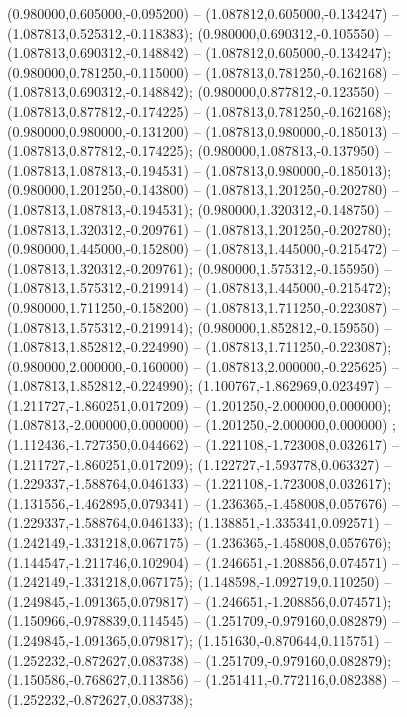  (0.980000,0.605000,-0.095200) -- (1.087812,0.605000,-0.134247) -- (1.087813,0.525312,-0.118383);
 (0.980000,0.690312,-0.105550) -- (1.087813,0.690312,-0.148842) -- (1.087812,0.605000,-0.134247);
 (0.980000,0.781250,-0.115000) -- (1.087813,0.781250,-0.162168) -- (1.087813,0.690312,-0.148842);
 (0.980000,0.877812,-0.123550) -- (1.087813,0.877812,-0.174225) -- (1.087813,0.781250,-0.162168);
 (0.980000,0.980000,-0.131200) -- (1.087813,0.980000,-0.185013) -- (1.087813,0.877812,-0.174225);
 (0.980000,1.087813,-0.137950) -- (1.087813,1.087813,-0.194531) -- (1.087813,0.980000,-0.185013);
 (0.980000,1.201250,-0.143800) -- (1.087813,1.201250,-0.202780) -- (1.087813,1.087813,-0.194531);
 (0.980000,1.320312,-0.148750) -- (1.087813,1.320312,-0.209761) -- (1.087813,1.201250,-0.202780);
 (0.980000,1.445000,-0.152800) -- (1.087813,1.445000,-0.215472) -- (1.087813,1.320312,-0.209761);
 (0.980000,1.575312,-0.155950) -- (1.087813,1.575312,-0.219914) -- (1.087813,1.445000,-0.215472);
 (0.980000,1.711250,-0.158200) -- (1.087813,1.711250,-0.223087) -- (1.087813,1.575312,-0.219914);
 (0.980000,1.852812,-0.159550) -- (1.087813,1.852812,-0.224990) -- (1.087813,1.711250,-0.223087);
 (0.980000,2.000000,-0.160000) -- (1.087813,2.000000,-0.225625) -- (1.087813,1.852812,-0.224990);
 (1.100767,-1.862969,0.023497) -- (1.211727,-1.860251,0.017209) -- (1.201250,-2.000000,0.000000);
 (1.087813,-2.000000,0.000000) -- (1.201250,-2.000000,0.000000) ;
 (1.112436,-1.727350,0.044662) -- (1.221108,-1.723008,0.032617) -- (1.211727,-1.860251,0.017209);
 (1.122727,-1.593778,0.063327) -- (1.229337,-1.588764,0.046133) -- (1.221108,-1.723008,0.032617);
 (1.131556,-1.462895,0.079341) -- (1.236365,-1.458008,0.057676) -- (1.229337,-1.588764,0.046133);
 (1.138851,-1.335341,0.092571) -- (1.242149,-1.331218,0.067175) -- (1.236365,-1.458008,0.057676);
 (1.144547,-1.211746,0.102904) -- (1.246651,-1.208856,0.074571) -- (1.242149,-1.331218,0.067175);
 (1.148598,-1.092719,0.110250) -- (1.249845,-1.091365,0.079817) -- (1.246651,-1.208856,0.074571);
 (1.150966,-0.978839,0.114545) -- (1.251709,-0.979160,0.082879) -- (1.249845,-1.091365,0.079817);
 (1.151630,-0.870644,0.115751) -- (1.252232,-0.872627,0.083738) -- (1.251709,-0.979160,0.082879);
 (1.150586,-0.768627,0.113856) -- (1.251411,-0.772116,0.082388) -- (1.252232,-0.872627,0.083738);
